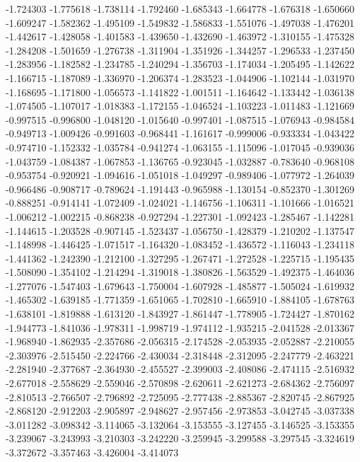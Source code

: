 -1.724303
-1.775618
-1.738114
-1.792460
-1.685343
-1.664778
-1.676318
-1.650660
-1.609247
-1.582362
-1.495109
-1.549832
-1.586833
-1.551076
-1.497038
-1.476201
-1.442617
-1.428058
-1.401583
-1.439650
-1.432690
-1.463972
-1.310155
-1.475328
-1.284208
-1.501659
-1.276738
-1.311904
-1.351926
-1.344257
-1.296533
-1.237450
-1.283956
-1.182582
-1.234785
-1.240294
-1.356703
-1.174034
-1.205495
-1.142622
-1.166715
-1.187089
-1.336970
-1.206374
-1.283523
-1.044906
-1.102144
-1.031970
-1.168695
-1.171800
-1.056573
-1.141822
-1.001511
-1.164642
-1.133442
-1.036138
-1.074505
-1.107017
-1.018383
-1.172155
-1.046524
-1.103223
-1.011483
-1.121669
-0.997515
-0.996800
-1.048120
-1.015640
-0.997401
-1.087515
-1.076943
-0.984584
-0.949713
-1.009426
-0.991603
-0.968441
-1.161617
-0.999006
-0.933334
-1.043422
-0.974710
-1.152332
-1.035784
-0.941274
-1.063155
-1.115096
-1.017045
-0.939036
-1.043759
-1.084387
-1.067853
-1.136765
-0.923045
-1.032887
-0.783640
-0.968108
-0.953754
-0.920921
-1.094616
-1.051018
-1.049297
-0.989406
-1.077972
-1.264039
-0.966486
-0.908717
-0.789624
-1.191443
-0.965988
-1.130154
-0.852370
-1.301269
-0.888251
-0.914141
-1.072409
-1.024021
-1.146756
-1.106311
-1.101666
-1.016521
-1.006212
-1.002215
-0.868238
-0.927294
-1.227301
-1.092423
-1.285467
-1.142281
-1.144615
-1.203528
-0.907145
-1.523437
-1.056750
-1.428379
-1.210202
-1.137547
-1.148998
-1.446425
-1.071517
-1.164320
-1.083452
-1.436572
-1.116043
-1.234118
-1.441362
-1.242390
-1.212100
-1.327295
-1.267471
-1.272528
-1.225715
-1.195435
-1.508090
-1.354102
-1.214294
-1.319018
-1.380826
-1.563529
-1.492375
-1.464036
-1.277076
-1.547403
-1.679643
-1.750004
-1.607928
-1.485877
-1.505024
-1.619932
-1.465302
-1.639185
-1.771359
-1.651065
-1.702810
-1.665910
-1.884105
-1.678763
-1.638101
-1.819888
-1.613120
-1.843927
-1.861447
-1.778905
-1.724427
-1.870162
-1.944773
-1.841036
-1.978311
-1.998719
-1.974112
-1.935215
-2.041528
-2.013367
-1.968940
-1.862935
-2.357686
-2.056315
-2.174528
-2.053935
-2.052887
-2.210055
-2.303976
-2.515450
-2.224766
-2.430034
-2.318448
-2.312095
-2.247779
-2.463221
-2.281940
-2.377687
-2.364930
-2.455527
-2.399003
-2.408086
-2.474115
-2.516932
-2.677018
-2.558629
-2.559046
-2.570898
-2.620611
-2.621273
-2.684362
-2.756097
-2.810513
-2.766507
-2.796892
-2.725095
-2.777438
-2.885367
-2.820745
-2.867925
-2.868120
-2.912203
-2.905897
-2.948627
-2.957456
-2.973853
-3.042745
-3.037338
-3.011282
-3.098342
-3.114065
-3.132064
-3.153555
-3.127455
-3.146525
-3.153355
-3.239067
-3.243993
-3.210303
-3.242220
-3.259945
-3.299588
-3.297545
-3.324619
-3.372672
-3.357463
-3.426004
-3.414073
